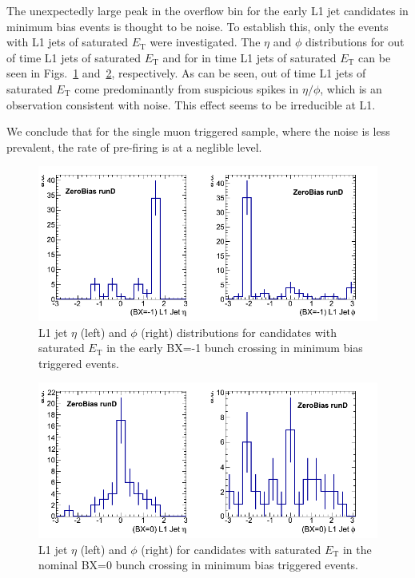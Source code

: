\documentclass[11pt]{cmspaperpdf}
\newcommand{\et}{\ensuremath{E_{\textrm{T}}}\xspace}
\begin{document}
The unexpectedly large peak in the overflow bin for the early L1 jet candidates in minimum bias events is thought to be noise. To establish this, only the events with L1 jets of saturated \et were investigated. The $\eta$ and $\phi$ distributions for out of time L1 jets of saturated \et and for in time L1 jets of saturated \et can be seen in Figs.~\ref{fig:early_eta_phi} and~\ref{fig:central_eta_phi}, respectively. As can be seen, out of time L1 jets of saturated \et come predominantly from suspicious spikes in $\eta/\phi$, which is an observation consistent with noise. This effect seems to be irreducible at L1.

We conclude that for the single muon triggered sample, where the noise is less prevalent, the rate of pre-firing is at a neglible level.

\begin{figure}
\centering
\includegraphics[scale=0.5]{plots/early_l1Jet_withSaturatedEt_eta_phi_ZeroBias_runD.png}
\caption{L1 jet $\eta$ (left) and $\phi$ (right) distributions for candidates with saturated \et in the early BX=-1 bunch crossing in minimum bias triggered events.}
\label{fig:early_eta_phi} 
\end{figure}
\begin{figure}
\centering
\includegraphics[scale=0.5]{plots/central_l1Jet_withSaturatedEt_eta_phi_ZeroBias_runD.png}
\caption{L1 jet $\eta$ (left) and $\phi$ (right) for candidates with saturated \et in the nominal BX=0 bunch crossing in minimum bias triggered events.} 
\label{fig:central_eta_phi} 
\end{figure}
\end{document}
